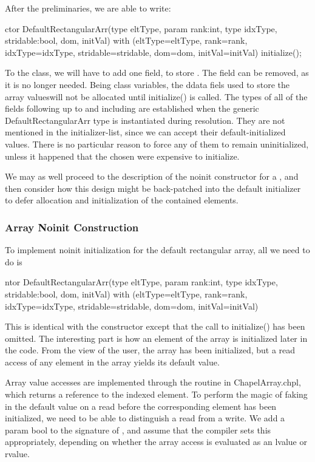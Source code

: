 After the preliminaries, we are able to write:
\begin{chapel}
  ctor DefaultRectangularArr(type eltType, param rank:int,
                             type idxType, stridable:bool,
                             dom, initVal)
  with (eltType=eltType, rank=rank, idxType=idxType,
        stridable=stridable, dom=dom, initVal=initVal)
  {
    initialize();
  }
\end{chapel}
To the class, we will have to add one field, to store .  The field
 can be removed, as it is no longer needed.  Being class variables, the
ddata fiels used to store the array valueswill not be allocated until initialize() is called.  The
types of all of the fields following  up to and including  are
established when the generic DefaultRectangularArr type is instantiated during
resolution.  They are not mentioned in the initializer-list, since we can accept their
default-initialized values.  There is no particular reason to force any of them to remain
uninitialized, unless it happened that the chosen  were expensive to
initialize.

We may as well proceed to the description of the noinit constructor for a
, and then consider how this design might be back-patched into
the default initializer to defer allocation and initialization of the contained elements.

\subsubsection{Array Noinit Construction}

To implement noinit initialization for the default rectangular array, all we need to do is 
\begin{chapel}
  ntor DefaultRectangularArr(type eltType, param rank:int,
                             type idxType, stridable:bool,
                             dom, initVal)
  with (eltType=eltType, rank=rank, idxType=idxType,
        stridable=stridable, dom=dom, initVal=initVal)
  {}
\end{chapel}
\noindent
This is identical with the constructor except that the call to initialize() has been
omitted.  The interesting part is how an element of the array is initialized later in the
code.  From the view of the user, the array has been initialized, but a read access of any
element in the array yields its default value.  

Array value accesses are implemented through the  routine in ChapelArray.chpl,
which returns a reference to the indexed element.  To perform the magic of faking in the
default value on a read before the corresponding element has been initialized, we need to
be able to distinguish a read from a write.  We add a param bool  to the
signature of , and assume that the compiler sets this appropriately,
depending on whether the array access is evaluated as an lvalue or rvalue.

